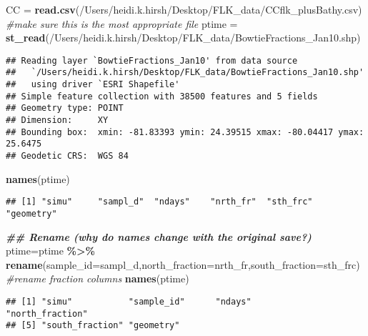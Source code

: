 \documentclass[
]{article}
\newenvironment{Shaded}{\begin{snugshade}}{\end{snugshade}}
\newcommand{\AttributeTok}[1]{\textcolor[rgb]{0.13,0.29,0.53}{#1}}
\newcommand{\CommentTok}[1]{\textcolor[rgb]{0.56,0.35,0.01}{\textit{#1}}}
\newcommand{\DocumentationTok}[1]{\textcolor[rgb]{0.56,0.35,0.01}{\textbf{\textit{#1}}}}
\newcommand{\FunctionTok}[1]{\textcolor[rgb]{0.13,0.29,0.53}{\textbf{#1}}}
\newcommand{\NormalTok}[1]{#1}
\newcommand{\OtherTok}[1]{\textcolor[rgb]{0.56,0.35,0.01}{#1}}
\newcommand{\SpecialCharTok}[1]{\textcolor[rgb]{0.81,0.36,0.00}{\textbf{#1}}}
\newcommand{\StringTok}[1]{\textcolor[rgb]{0.31,0.60,0.02}{#1}}
\begin{document}
\begin{Shaded}
\begin{Highlighting}[]
\NormalTok{CC }\OtherTok{=} \FunctionTok{read.csv}\NormalTok{(}\StringTok{\textquotesingle{}/Users/heidi.k.hirsh/Desktop/FLK\_data/CCflk\_plusBathy.csv\textquotesingle{}}\NormalTok{) }\CommentTok{\#make sure this is the most appropriate file}
\NormalTok{ptime }\OtherTok{=} \FunctionTok{st\_read}\NormalTok{(}\StringTok{\textquotesingle{}/Users/heidi.k.hirsh/Desktop/FLK\_data/BowtieFractions\_Jan10.shp\textquotesingle{}}\NormalTok{)}
\end{Highlighting}
\end{Shaded}

\begin{verbatim}
## Reading layer `BowtieFractions_Jan10' from data source 
##   `/Users/heidi.k.hirsh/Desktop/FLK_data/BowtieFractions_Jan10.shp' 
##   using driver `ESRI Shapefile'
## Simple feature collection with 38500 features and 5 fields
## Geometry type: POINT
## Dimension:     XY
## Bounding box:  xmin: -81.83393 ymin: 24.39515 xmax: -80.04417 ymax: 25.6475
## Geodetic CRS:  WGS 84
\end{verbatim}

\begin{Shaded}
\begin{Highlighting}[]
\FunctionTok{names}\NormalTok{(ptime)}
\end{Highlighting}
\end{Shaded}

\begin{verbatim}
## [1] "simu"     "sampl_d"  "ndays"    "nrth_fr"  "sth_frc"  "geometry"
\end{verbatim}

\begin{Shaded}
\begin{Highlighting}[]
\DocumentationTok{\#\# Rename (why do names change with the original save?)}
\NormalTok{ptime}\OtherTok{=}\NormalTok{ptime }\SpecialCharTok{\%\textgreater{}\%} \FunctionTok{rename}\NormalTok{(}\AttributeTok{sample\_id=}\NormalTok{sampl\_d,}\AttributeTok{north\_fraction=}\NormalTok{nrth\_fr,}\AttributeTok{south\_fraction=}\NormalTok{sth\_frc) }\CommentTok{\#rename fraction columns}
\FunctionTok{names}\NormalTok{(ptime)}
\end{Highlighting}
\end{Shaded}

\begin{verbatim}
## [1] "simu"           "sample_id"      "ndays"          "north_fraction"
## [5] "south_fraction" "geometry"
\end{verbatim}
\end{document}
